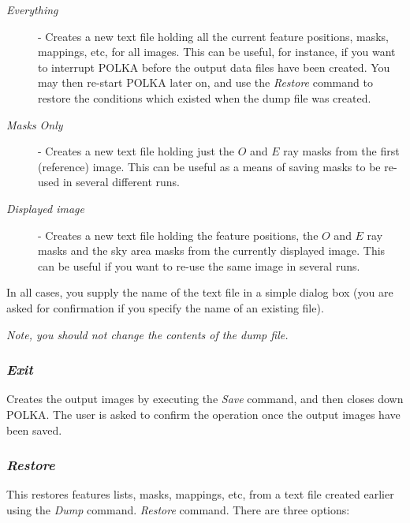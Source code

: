 \documentclass[11pt]{article}
\newcommand{\htmlref}[2]{#1}
\newcommand{\xlabel}[1]{}
\newcommand{\mylabel}[1] {\xlabel{#1}\label{#1}}
\begin{document}
\begin{description}

\item [\emph{Everything}] - Creates a new text file holding all the current
feature positions, masks, mappings, etc, for all images. This can be useful,
for instance, if you want to interrupt POLKA before the output data files
have been created. You may then re-start POLKA later on, and use the
\htmlref{\emph{Restore}}{POLKA_RESTORE} command to restore the conditions
which existed when the dump file was created.

\item [\emph{Masks Only}] - Creates a new text file holding just the $O$
and $E$ ray masks from the first (reference) image. This can be useful
as a means of saving masks to be re-used in several different runs.

\item [\emph{Displayed image}] - Creates a new text file holding the
feature positions, the $O$ and $E$ ray masks and the sky area masks from the
currently displayed image. This can be useful if you want to re-use the
same image in several runs.

\end{description}

In all cases, you supply the name of the text file in a simple dialog
box (you are asked for confirmation if you specify the name of an
existing file).

\emph{{\center Note, you should not change the contents of the dump file.}}

\subsubsection {\mylabel{POLKA_EXIT}\emph{Exit}} Creates the output images by executing
the \htmlref{\emph{Save}}{POLKA_SAVE} command, and then closes down
POLKA. The user is asked to confirm the operation once the output images
have been saved.

\subsubsection {\mylabel{POLKA_RESTORE}\emph{Restore}}
This restores features lists, masks, mappings, etc, from a text file
created earlier using the \htmlref{\emph{Dump}}{POLKA_DUMP} command.
\htmlref{\emph{Restore}}{POLKA_RESTORE} command. There are three
options:
\end{document}

